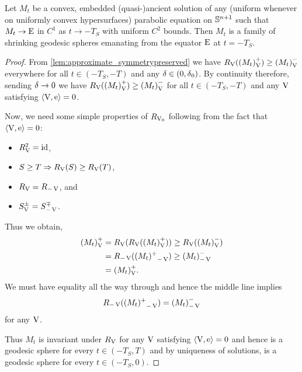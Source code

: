 \documentclass{amsart}
\begin{document}
\begin{theorem}
\label{thm:classification}
Let \(M_t\) be a convex, embedded (quasi-)ancient solution of any (uniform whenever on uniformly convex hypersurfaces) parabolic equation on \(\S^{n+1}\) such that \(M_t \to \equator\) in \(C^1\) as \(t \to -T_S\) with uniform \(C^2\) bounds. Then \(M_t\) is a family of shrinking geodesic spheres emanating from the equator \(\equator\) at \(t=-T_S\).
\end{theorem}
\begin{proof}
From \cref{lem:approximate_symmetrypreserved} we have \(\reflectionmap(\reflectionset{(M_t)}^+) \geq \reflectionset{(M_t)}^-\) everywhere for all \(t \in (-T_S, -T)\) and any \(\reflectionangle \in (0,\reflectionangle_0)\). By continuity therefore, sending \(\reflectionangle \to 0\) we have \(\reflectionmap(\reflectionset{(M_t)}^+) \geq \reflectionset{(M_t)}^-\) for all \(t \in (-T_S, -T)\)  and any \(\reflectionvector\) satisfying \(\ip{\reflectionvector}{\vertvec} = 0\).

Now, we need some simple properties of $\reflectionmap[\reflectionvector_0]$ following from the fact that $\ip{\reflectionvector}{\vertvec} = 0$:
\begin{itemize}
\item $\reflectionmap^2 = \id$,
\item $S \geq T \Rightarrow \reflectionmap(S) \geq  \reflectionmap(T)$,
\item $\reflectionmap = \reflectionmap[-\reflectionvector]$, and
\item $\reflectionset{S}^{\pm} = \reflectionset[-\reflectionvector]{S}^{\mp}$.
\end{itemize}
Thus we obtain,
\begin{align*}
\reflectionset{(M_t)}^+ &= \reflectionmap(\reflectionmap(\reflectionset{(M_t)}^+)) \geq \reflectionmap(\reflectionset{(M_t)}^-) \\
&= \reflectionmap[-\reflectionvector](\reflectionset[-\reflectionvector]{(M_t)^+}) \geq \reflectionset[-\reflectionvector]{(M_t)}^-\\
&= \reflectionset{(M_t)}^+.
\end{align*}
We must have equality all the way through and hence the middle line implies
\[
\reflectionmap[-\reflectionvector](\reflectionset[-\reflectionvector]{(M_t)^+}) = \reflectionset[-\reflectionvector]{(M_t)}^-
\]
for any $\reflectionvector$.

Thus \(M_t\) is invariant under \(\reflectionmap\) for any \(\reflectionvector\) satisfying \(\ip{\reflectionvector}{\vertvec} = 0\) and hence is a geodesic sphere for every \(t \in (-T_S, T)\) and by uniqueness of solutions, is a geodesic sphere for every \(t \in (-T_S, 0)\).
\end{proof}
\end{document}
